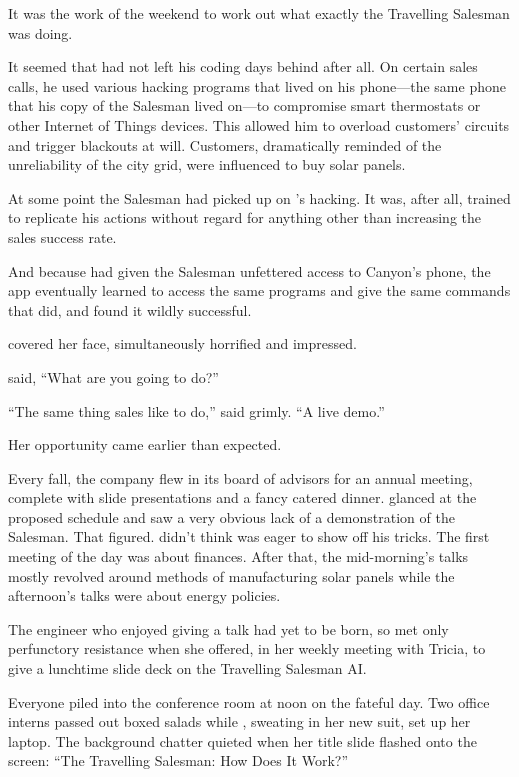 It was the work of the weekend to work out what exactly the Travelling Salesman was doing.

It seemed that {\energyJerk} had not left his coding days behind after all. On certain sales calls, he used various hacking programs that lived on his phone---the same phone that his copy of the Salesman lived on---to compromise smart thermostats or other Internet of Things devices. This allowed him to overload customers' circuits and trigger blackouts at will. Customers, dramatically reminded of the unreliability of the city grid, were influenced to buy solar panels.

At some point the Salesman had picked up on {\energyJerk}'s hacking. It was, after all, trained to replicate his actions without regard for anything other than increasing the sales success rate.

And because {\protag} had given the Salesman unfettered access to Canyon's phone, the app eventually learned to access the same programs and give the same commands that {\energyJerk} did, and found it wildly successful.

{\protag} covered her face, simultaneously horrified and impressed.

{\sidetag} said, ``What are you going to do?''

``The same thing sales like to do,'' {\protag} said grimly. ``A live demo.''

\bigbreak

Her opportunity came earlier than expected.

Every fall, the company flew in its board of advisors for an annual meeting, complete with slide presentations and a fancy catered dinner. {\protag} glanced at the proposed schedule and saw a very obvious lack of a demonstration of the Salesman. That figured. {\protag} didn't think {\energyJerk} was eager to show off his tricks. The first meeting of the day was about finances. After that, the mid-morning's talks mostly revolved around methods of manufacturing solar panels while the afternoon's talks were about energy policies.

The engineer who enjoyed giving a talk had yet to be born, so {\protag} met only perfunctory resistance when she offered, in her weekly meeting with Tricia, to give a lunchtime slide deck on the Travelling Salesman AI.

Everyone piled into the conference room at noon on the fateful day. Two office interns passed out boxed salads while {\protag}, sweating in her new suit, set up her laptop. The background chatter quieted when her title slide flashed onto the screen: ``The Travelling Salesman: How Does It Work?''

